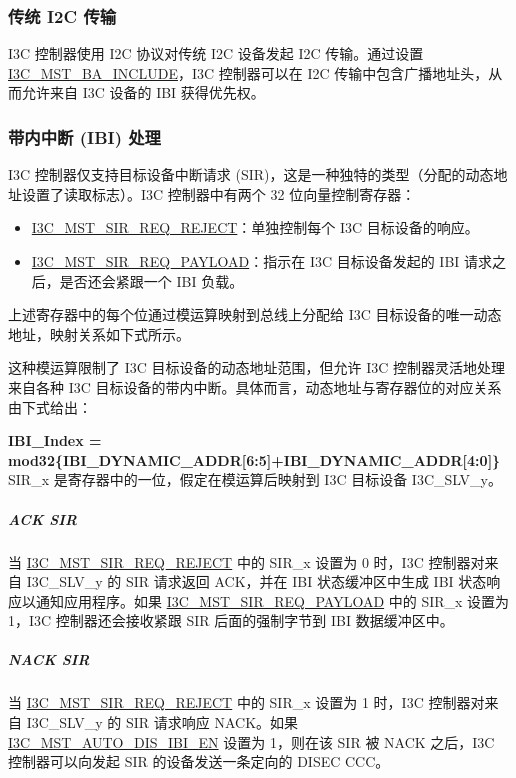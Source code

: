 \documentclass[main\_\_CN.tex]{subfiles}
\begin{document}
\subsubsection{传统 I2C 传输}

I3C 控制器使用 I2C 协议对传统 I2C 设备发起 I2C 传输。通过设置 \hyperref[fielddesc:I3CMSTREGBAINCLUDE]{I3C\_MST\_BA\_INCLUDE}，I3C 控制器可以在 I2C 传输中包含广播地址头，从而允许来自 I3C 设备的 IBI 获得优先权。

\subsubsection{带内中断 (IBI) 处理}

I3C 控制器仅支持目标设备中断请求 (SIR)，这是一种独特的类型（分配的动态地址设置了读取标志）。I3C 控制器中有两个 32 位向量控制寄存器：

\begin{itemize}
    \item \hyperref[regdesc:I3CMSTIBISIRREQREJECTREG]{I3C\_MST\_SIR\_REQ\_REJECT}：单独控制每个 I3C 目标设备的响应。
    \item \hyperref[regdesc:I3CMSTIBISIRREQPAYLOADREG]{I3C\_MST\_SIR\_REQ\_PAYLOAD}：指示在 I3C 目标设备发起的 IBI 请求之后，是否还会紧跟一个 IBI 负载。
\end{itemize}

上述寄存器中的每个位通过模运算映射到总线上分配给 I3C 目标设备的唯一动态地址，映射关系如下式所示。

这种模运算限制了 I3C 目标设备的动态地址范围，但允许 I3C 控制器灵活地处理来自各种 I3C 目标设备的带内中断。具体而言，动态地址与寄存器位的对应关系由下式给出：

\textbf{IBI\_Index = mod32\{IBI\_DYNAMIC\_ADDR[6:5]+IBI\_DYNAMIC\_ADDR[4:0]\}}\\

SIR\_x 是寄存器中的一位，假定在模运算后映射到 I3C 目标设备 I3C\_SLV\_y。

\subparagraph{ACK SIR}
当 \hyperref[regdesc:I3CMSTIBISIRREQREJECTREG]{I3C\_MST\_SIR\_REQ\_REJECT} 中的 SIR\_x 设置为 0 时，I3C 控制器对来自 I3C\_SLV\_y 的 SIR 请求返回 ACK，并在 IBI 状态缓冲区中生成 IBI 状态响应以通知应用程序。如果 \hyperref[regdesc:I3CMSTIBISIRREQPAYLOADREG]{I3C\_MST\_SIR\_REQ\_PAYLOAD} 中的 SIR\_x 设置为 1，I3C 控制器还会接收紧跟 SIR 后面的强制字节到 IBI 数据缓冲区中。

\subparagraph{NACK SIR}
当 \hyperref[regdesc:I3CMSTIBISIRREQREJECTREG]{I3C\_MST\_SIR\_REQ\_REJECT} 中的 SIR\_x 设置为 1 时，I3C 控制器对来自 I3C\_SLV\_y 的 SIR 请求响应 NACK。如果 \hyperref[fielddesc:I3CMSTREGAUTODISIBIEN]{I3C\_MST\_AUTO\_DIS\_IBI\_EN} 设置为 1，则在该 SIR 被 NACK 之后，I3C 控制器可以向发起 SIR 的设备发送一条定向的 DISEC CCC。
\end{document}
